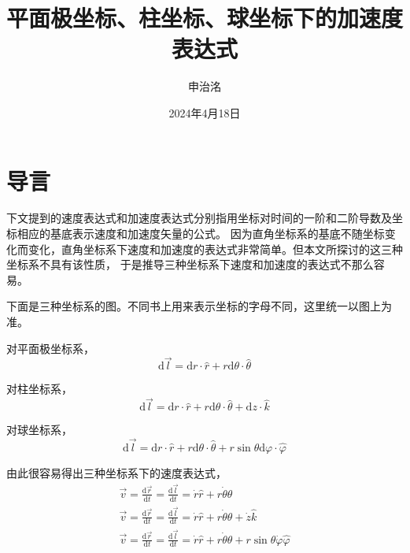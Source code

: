 \documentclass{ctexart}
\title{平面极坐标、柱坐标、球坐标下的加速度表达式}
\author{申治洺}
\date{2024年4月18日}  %
\begin{document}
    \maketitle  %
    
    \section{导言}\label{sec:1}

    下文提到的速度表达式和加速度表达式分别指用坐标对时间的一阶和二阶导数及坐标相应的基底表示速度和加速度矢量的公式。
    因为直角坐标系的基底不随坐标变化而变化，直角坐标系下速度和加速度的表达式非常简单。但本文所探讨的这三种坐标系不具有该性质，
    于是推导三种坐标系下速度和加速度的表达式不那么容易。

    下面是三种坐标系的图。不同书上用来表示坐标的字母不同，这里统一以图上为准。

    对平面极坐标系，
    \begin{equation*}
        \mathrm{d}\vec{l} = \mathrm{d}r\cdot\hat{r} + r\mathrm{d}\theta\cdot\hat{\theta}
    \end{equation*}
    
    对柱坐标系，
    \begin{equation*}
        \mathrm{d}\vec{l} = \mathrm{d}r\cdot\hat{r} + r\mathrm{d}\theta\cdot\hat{\theta} +
        \mathrm{d}z\cdot\hat{k}
    \end{equation*}
    
    对球坐标系，
    \begin{equation*}
        \mathrm{d}\vec{l} = \mathrm{d}r\cdot\hat{r} + r\mathrm{d}\theta\cdot\hat{\theta} +
        r\sin\theta\mathrm{d}\varphi\cdot\hat{\varphi}
    \end{equation*}

    由此很容易得出三种坐标系下的速度表达式，
    \begin{gather*}
        \vec{v} = \frac{\mathrm{d}\vec{r}}{\mathrm{d}t} = \frac{\mathrm{d}\vec{l}}{\mathrm{d}t} =
        \dot{r}\hat{r} + r\dot{\theta}\hat{\theta} \\
        \vec{v} = \frac{\mathrm{d}\vec{r}}{\mathrm{d}t} = \frac{\mathrm{d}\vec{l}}{\mathrm{d}t} =
        \dot{r}\hat{r} + r\dot{\theta}\hat{\theta} + \dot{z}\hat{k} \\
        \vec{v} = \frac{\mathrm{d}\vec{r}}{\mathrm{d}t} = \frac{\mathrm{d}\vec{l}}{\mathrm{d}t} =
        \dot{r}\hat{r} + r\dot{\theta}\hat{\theta} + r\sin\theta\dot{\varphi}\hat{\varphi}
    \end{gather*}
\end{document}
